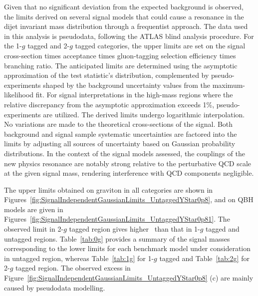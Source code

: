 

Given that no significant deviation from the expected background is observed, the limits derived on several signal models that could cause a resonance in the dijet invariant mass distribution through a frequentist approach. The data used in this analysis is pseudodata, following the ATLAS blind analysis procedure. For the 1-$g$ tagged and 2-$g$ tagged categories, the upper limits are set on the signal cross-section times acceptance times gluon-tagging selection efficiency times branching ratio.  The anticipated limits are determined using the asymptotic approximation of the test statistic's distribution, complemented by pseudo-experiments shaped by the background uncertainty values from the maximum-likelihood fit. For signal interpretations in the high-mass regions where the relative discrepancy from the asymptotic approximation exceeds 1\%, pseudo-experiments are utilized. The derived limits undergo logarithmic interpolation. No variations are made to the theoretical cross-sections of the signal. Both background and signal sample systematic uncertainties are factored into the limits by adjusting all sources of uncertainty based on Gaussian probability distributions. In the context of the signal models assessed, the couplings of the new physics resonance are notably strong relative to the perturbative QCD scale at the given signal mass, rendering interference with QCD components negligible.


The upper limits obtained on graviton in all categories are shown in Figures~\ref{fig:SignalIndependentGaussianLimits_UntaggedYStar0p8}, and on QBH models are given in Figures~\ref{fig:SignalIndependentGaussianLimits_UntaggedYStar0p81}. The observed limit in 2-$g$ tagged region gives higher \mjj\ than that in 1-$g$ tagged and untagged regions. Table~\ref{tab:0g} provides a summary of the signal masses corresponding to the lower limits for each benchmark model under consideration in untagged region, whereas Table~\ref{tab:1g} for 1-$g$ tagged and Table~\ref{tab:2g} for  2-$g$ tagged region.  The observed excess in Figure~\ref{fig:SignalIndependentGaussianLimits_UntaggedYStar0p8} (c) are mainly caused by pseudodata modelling. %



